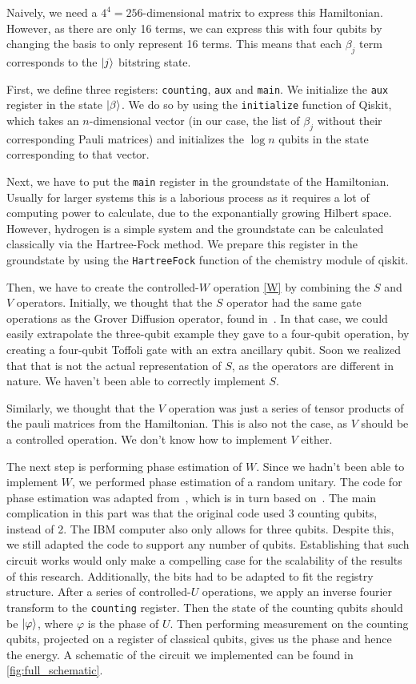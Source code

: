 \documentclass{article}
\begin{document}
Naively, we need a $4^4 = 256$-dimensional matrix to express this Hamiltonian. However, as there are only 16 terms, we can express this with four qubits by changing the basis to only represent 16 terms.  This means that each $\beta_j$ term corresponds to the $\ket{j}$ bitstring state.

First, we define three registers:  \verb|counting|, \verb|aux| and \verb|main|. We initialize the \verb|aux| register in the state $\ket{\beta}$. We do so by using the \verb|initialize| function of Qiskit, which takes an $n$-dimensional vector (in our case, the list of $\beta_j$ without their corresponding Pauli matrices) and initializes the $\log{n}$  qubits in the state corresponding to that vector.

Next, we have to put the \verb|main| register in the groundstate of the Hamiltonian. Usually for larger systems this is a laborious process as it requires a lot of computing power to calculate, due to the exponantially growing Hilbert space. However, hydrogen is a simple system and the groundstate can be  calculated classically via the Hartree-Fock method. We prepare this register in the groundstate by using the \verb|HartreeFock| function of the chemistry module of qiskit.

Then, we have to create the controlled-$W$ operation \cref{W} by combining the $S$ and $V$ operators. Initially, we thought that the $S$ operator had the same gate operations as the Grover Diffusion operator, found in~\cite{Qiskit-Textbook}. In that case, we could easily extrapolate the three-qubit example they gave to a four-qubit operation, by creating a four-qubit Toffoli gate with an extra ancillary qubit. Soon we realized that that is not the actual representation of $S$, as the operators are different in nature. We haven't been able to correctly implement $S$.

Similarly, we thought that the $V$ operation was just a series of tensor products of the pauli matrices from the Hamiltonian. This is also not the case, as $V$ should be a controlled operation. We don't know how to implement $V$ either.

The next step is performing phase estimation of $W$. Since we hadn't
been able to implement $W$, we performed phase estimation of a random
unitary. The code for phase estimation was adapted
from~\cite{Qiskit-Textbook}, which is in turn based
on~\textcite{nielsen}. The main complication in this part was that the
original code used 3 counting qubits, instead of 2. The IBM computer also
only allows for three qubits. Despite this, we still adapted the code
to support any number of qubits. Establishing that such circuit works
would only make a compelling case for the scalability of the results
of this research. Additionally, the bits had
to be adapted to fit the registry structure. After a series of controlled-$U$ operations, we apply an inverse fourier transform to the \verb|counting| register. Then the state of the counting qubits should be $\ket{\varphi}$, where $\varphi$ is the phase of $U$. Then performing measurement on the counting qubits, projected on a register of classical qubits, gives us the phase and hence the energy. A schematic of the circuit we implemented can be found in \cref{fig:full_schematic}.
\end{document}
